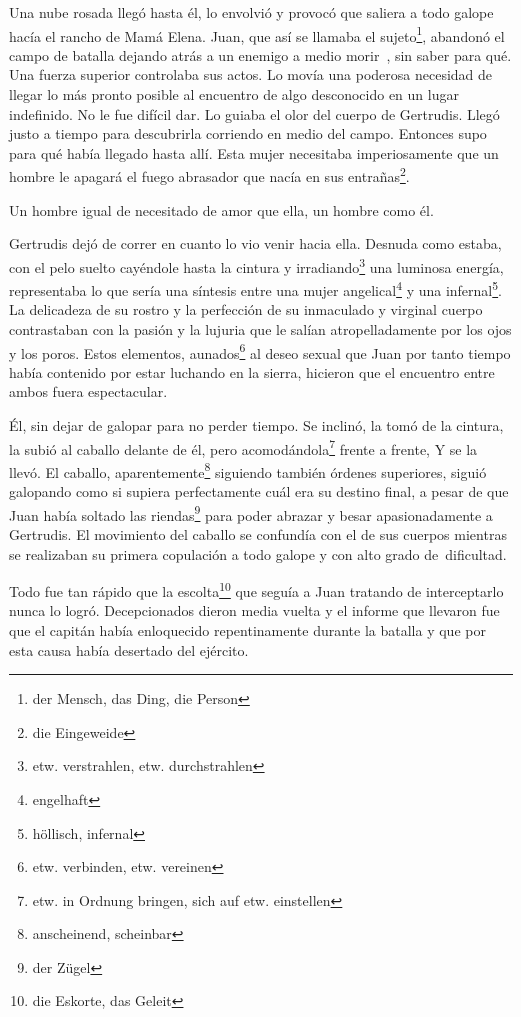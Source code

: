 Una nube rosada llegó hasta él, lo envolvió y provocó que saliera a
todo galope hacía el rancho de Mamá Elena. Juan, que así se llamaba el sujeto\footnote{der Mensch, das Ding, die Person}, abandonó el
campo de batalla dejando atrás a un enemigo a medio morir~, sin saber
para qué. Una fuerza superior controlaba sus actos. Lo movía una poderosa
necesidad de llegar lo más pronto posible al encuentro de algo desconocido
en un lugar indefinido. No le fue difícil dar. Lo guiaba el olor del cuerpo
de Gertrudis. Llegó justo a tiempo para descubrirla corriendo en medio del
campo. Entonces supo para qué había llegado hasta allí. Esta mujer necesitaba
imperiosamente que un hombre le apagará el fuego abrasador que nacía en
sus entrañas\footnote{die Eingeweide}.

Un hombre igual de necesitado de amor que ella, un hombre como él.

Gertrudis dejó de correr en cuanto lo vio venir hacia ella. Desnuda
como estaba, con el pelo suelto cayéndole hasta la cintura y irradiando\footnote{etw. verstrahlen, etw. durchstrahlen}
una luminosa energía, representaba lo que sería una síntesis entre una
mujer angelical\footnote{engelhaft} y una infernal\footnote{höllisch, infernal}.
La delicadeza de su rostro y la perfección de su inmaculado y virginal
cuerpo contrastaban con la pasión y la lujuria que le salían atropelladamente
por los ojos y los poros.
Estos elementos, aunados\footnote{etw. verbinden, etw. vereinen}
al deseo sexual que Juan por tanto tiempo había
contenido por estar luchando en la sierra, hicieron que el encuentro
entre ambos fuera espectacular.

Él, sin dejar de galopar para no perder tiempo. Se inclinó, la tomó de
la cintura, la subió al caballo delante de él, pero acomodándola\footnote{etw. in Ordnung bringen, sich auf etw. einstellen } frente
a frente, Y se la llevó. El caballo, aparentemente\footnote{anscheinend, scheinbar}
siguiendo también órdenes superiores, siguió galopando como si supiera perfectamente cuál
era su destino final, a pesar de que Juan había soltado las riendas\footnote{der Zügel} para
poder abrazar y besar apasionadamente a Gertrudis. El movimiento del
caballo se confundía con el de sus cuerpos mientras se realizaban su
primera copulación a todo galope y con alto grado de~dificultad.

Todo fue tan rápido que la escolta\footnote{die Eskorte, das Geleit}
que seguía a Juan tratando de interceptarlo
nunca lo logró. Decepcionados dieron media vuelta y el
informe que llevaron fue que el capitán había enloquecido repentinamente
durante la batalla y que por esta causa había desertado del ejército.

